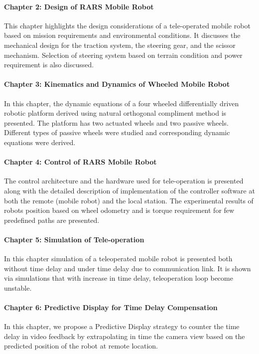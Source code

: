 \paragraph*{Chapter 2: Design of RARS Mobile Robot\\}
This chapter highlights the design considerations of a tele-operated mobile robot based on mission requirements and  environmental conditions.  It  discusses the mechanical design for the traction system, the steering gear, and the scissor mechanism. Selection of  steering system based on terrain condition and power requirement is also discussed.   
\paragraph*{Chapter 3: Kinematics and Dynamics of Wheeled Mobile Robot \\}
In this chapter, the dynamic equations of a four wheeled differentially driven robotic platform derived using natural orthogonal compliment method is presented. The platform has two actuated wheels and two passive wheels. Different types of passive wheels were studied and  corresponding dynamic equations were derived. 
\paragraph*{Chapter 4: Control of RARS Mobile Robot \\}
The control architecture and the hardware used for tele-operation is presented along with the detailed description of implementation of the controller software at both the remote (mobile robot)  and the local station. The experimental results of robots position based on wheel odometry and is torque requirement for few predefined paths are presented. 

\paragraph*{Chapter 5: Simulation of Tele-operation \\}
In this chapter simulation of a teleoperated mobile robot is presented both without time delay and  under time delay due to communication link. It is shown via simulations that with increase in time delay,  teleoperation loop become unstable. 
 
\paragraph*{Chapter 6: Predictive Display for Time Delay Compensation\\}
In this chapter,  we propose a Predictive Display strategy to counter the time delay in video feedback by extrapolating in time  the camera view based on the predicted position of the robot at remote location. 

